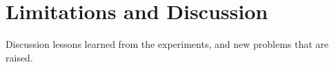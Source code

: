 \chapter{Limitations and Discussion}\label{chap:discussion}
Discussion lessons learned from the experiments, and new problems that are raised. 
